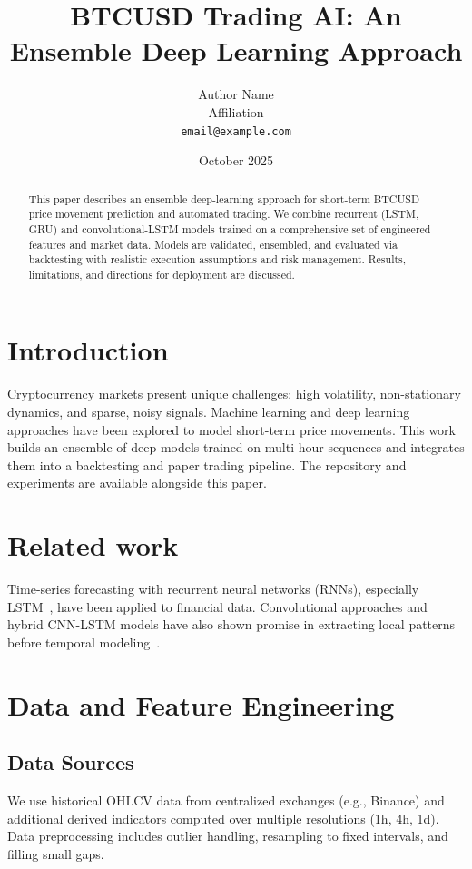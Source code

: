 \documentclass[11pt,a4paper]{article}
\title{BTCUSD Trading AI: An Ensemble Deep Learning Approach}
\author{Author Name \\ Affiliation \\ \texttt{email@example.com}}
\date{October 2025}
\begin{document}
\maketitle

\begin{abstract}
This paper describes an ensemble deep-learning approach for short-term BTCUSD price movement prediction and automated trading. We combine recurrent (LSTM, GRU) and convolutional-LSTM models trained on a comprehensive set of engineered features and market data. Models are validated, ensembled, and evaluated via backtesting with realistic execution assumptions and risk management. Results, limitations, and directions for deployment are discussed.
\end{abstract}

\section{Introduction}
Cryptocurrency markets present unique challenges: high volatility, non-stationary dynamics, and sparse, noisy signals. Machine learning and deep learning approaches have been explored to model short-term price movements. This work builds an ensemble of deep models trained on multi-hour sequences and integrates them into a backtesting and paper trading pipeline. The repository and experiments are available alongside this paper.

\section{Related work}
Time-series forecasting with recurrent neural networks (RNNs), especially LSTM~\citep{hochreiter1997long}, have been applied to financial data. Convolutional approaches and hybrid CNN-LSTM models have also shown promise in extracting local patterns before temporal modeling~\citep{zhou2015c}.

\section{Data and Feature Engineering}
\subsection{Data Sources}
We use historical OHLCV data from centralized exchanges (e.g., Binance) and additional derived indicators computed over multiple resolutions (1h, 4h, 1d). Data preprocessing includes outlier handling, resampling to fixed intervals, and filling small gaps.
\end{document}
